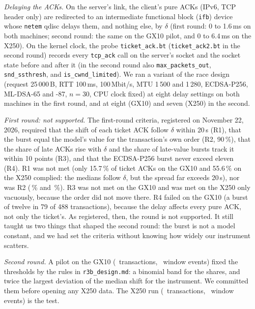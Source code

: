 \documentclass[9pt]{article}
\begin{document}
\emph{Delaying the ACKs.} On the server's link, the client's pure ACKs (IPv6, TCP header only) are redirected to an intermediate functional block (\texttt{ifb}) device whose \texttt{netem} qdisc delays them, and nothing else, by $\delta$ (first round: 0 to 1.6\,ms on both machines; second round: the same on the GX10 pilot, and 0 to 6.4\,ms on the X250). On the kernel clock, the probe \texttt{ticket\_ack.bt} (\texttt{ticket\_ack2.bt} in the second round) records every \texttt{tcp\_ack} call on the server's socket and the socket state before and after it (in the second round also \texttt{max\_packets\_out}, \texttt{snd\_ssthresh}, and \texttt{is\_cwnd\_limited}). We ran a variant of the race design (request 25\,000\,B, RTT 100\,ms, 100\,Mbit/s, MTU 1\,500 and 1\,280, ECDSA-P256, ML-DSA-65 and -87, $n=30$, CPU clock fixed) at eight delay settings on both machines in the first round, and at eight (GX10) and seven (X250) in the second.

\emph{First round: not supported.} The first-round criteria, registered on November 22, 2026, required that the shift of each ticket ACK follow $\delta$ within 20\,\textmu s (R1), that the burst equal the model's value for the transaction's own order (R2, 90\,\%), that the share of late ACKs rise with $\delta$ and the share of late-value bursts track it within 10 points (R3), and that the ECDSA-P256 burst never exceed eleven (R4). R1 was not met (only 15.7\,\% of ticket ACKs on the GX10 and 55.6\,\% on the X250 complied: the medians follow $\delta$, but the spread far exceeds 20\,\textmu s), nor was R2 (\RbRoundThreeAMatch\,\% and \RbRoundThreeXMatch\,\%). R3 was not met on the GX10 and was met on the X250 only vacuously, because the order did not move there. R4 failed on the GX10 (a burst of twelve in 79 of 488 transactions), because the delay affects every pure ACK, not only the ticket's. As registered, then, the round is not supported. It still taught us two things that shaped the second round: the burst is not a model constant, and we had set the criteria without knowing how widely our instrument scatters.

\emph{Second round.} A pilot on the GX10 (\RbPilotTxN\ transactions, \RbPilotEvN\ window events) fixed the thresholds by the rules in \texttt{r3b\_design.md}: a binomial band for the shares, and twice the largest deviation of the median shift for the instrument. We committed them before opening any X250 data. The X250 run (\RbTestTxN\ transactions, \RbTestEvN\ window events) is the test.
\end{document}
